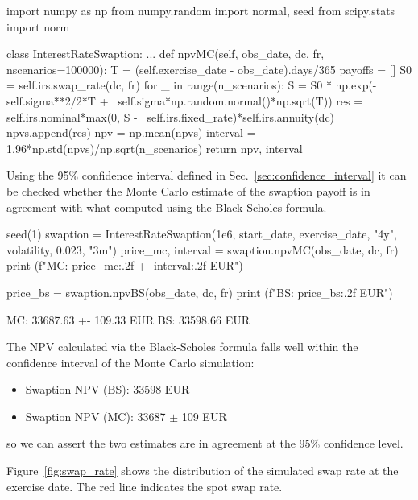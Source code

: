 \begin{ipython}
import numpy as np
from numpy.random import normal, seed
from scipy.stats import norm 

class InterestRateSwaption:
    ...
    def npvMC(self, obs_date, dc, fr, nscenarios=100000):
        T = (self.exercise_date - obs_date).days/365
        payoffs = []
        S0 = self.irs.swap_rate(dc, fr)
        for _ in range(n_scenarios):
            S = S0 * np.exp(-self.sigma**2/2*T + \
                            self.sigma*np.random.normal()*np.sqrt(T))
            res = self.irs.nominal*max(0, S - \
                                          self.irs.fixed_rate)*self.irs.annuity(dc)
            npvs.append(res)
        npv = np.mean(npvs)
        interval = 1.96*np.std(npvs)/np.sqrt(n_scenarios)
        return npv, interval
\end{ipython}

Using the 95\% confidence interval defined in Sec.~\ref{sec:confidence_interval} it can be checked whether the Monte Carlo estimate of the swaption payoff is in agreement with what computed using the Black-Scholes formula.

\begin{ipython}
seed(1)
swaption = InterestRateSwaption(1e6, start_date, exercise_date, "4y",
                                volatility, 0.023, "3m")
price_mc, interval = swaption.npvMC(obs_date, dc, fr)
print (f"MC: {price_mc:.2f} +- {interval:.2f} EUR")

price_bs = swaption.npvBS(obs_date, dc, fr)
print (f"BS: {price_bs:.2f} EUR")
\end{ipython}
\begin{ioutput}
MC: 33687.63 +- 109.33 EUR
BS: 33598.66 EUR
\end{ioutput}

The NPV calculated via the Black-Scholes formula falls well within the confidence interval of the Monte Carlo simulation:

\begin{itemize}
\tightlist
\item Swaption NPV (BS): 33598 EUR
\item Swaption NPV (MC): 33687 $\pm$ 109 EUR
\end{itemize}
so we can assert the two estimates are in agreement at the 95\% confidence level.

Figure~\ref{fig:swap_rate} shows the distribution of the simulated swap rate at the exercise date. The red line indicates the spot swap rate.

